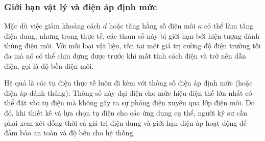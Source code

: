 \subsubsection{Giới hạn vật lý và điện áp định mức}
Mặc dù việc giảm khoảng cách $d$ hoặc tăng hằng số điện môi $\kappa$ có thể làm tăng điện dung, nhưng trong thực tế, các tham số này bị giới hạn bởi hiện tượng đánh thủng điện môi. Với mỗi loại vật liệu, tồn tại một giá trị cường độ điện trường tối đa mà nó có thể chịu đựng được trước khi mất tính cách điện và trở nên dẫn điện, gọi là độ bền điện môi.

Hệ quả là các tụ điện thực tế luôn đi kèm với thông số điện áp định mức (hoặc điện áp đánh thủng). Thông số này đại diện cho mức hiệu điện thế lớn nhất có thể đặt vào tụ điện mà không gây ra sự phóng điện xuyên qua lớp điện môi. Do đó, khi thiết kế và lựa chọn tụ điện cho các ứng dụng cụ thể, người kỹ sư cần phải xem xét đồng thời cả giá trị điện dung và giới hạn điện áp hoạt động để đảm bảo an toàn và độ bền cho hệ thống.
